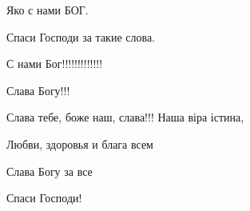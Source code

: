 \begin{itemize}
Яко с нами БОГ. 🙏

 
Спаси Господи за такие слова.

 
С нами Бог!!!!!!!!!!!!!

 
Слава Богу!!!

 
Слава тебе, боже наш, слава!!! Наша віра істина,

 
Любви, здоровья и блага всем

 
Слава Богу за все

 
Спаси Господи!


\end{itemize}
